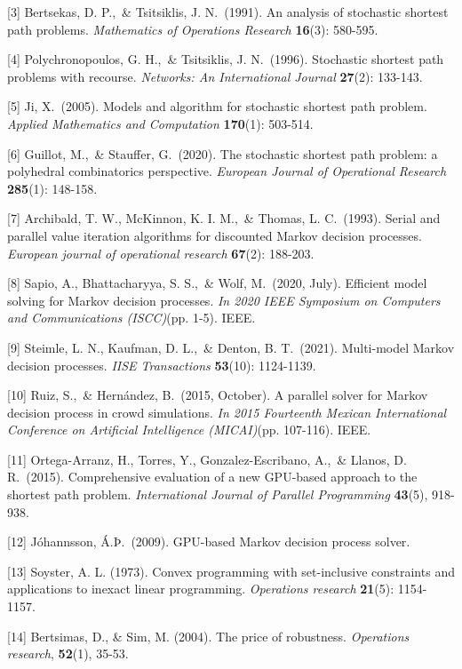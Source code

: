 \documentclass{article}
\begin{document}
[3] Bertsekas, D. P.,\ \& Tsitsiklis, J. N.\ (1991). An analysis of stochastic shortest path problems. 
  {\it Mathematics of Operations Research} {\bf 16}(3): 580-595.

[4] Polychronopoulos, G. H.,\ \& Tsitsiklis, J. N.\ (1996). Stochastic shortest path problems with 
  recourse. {\it Networks: An International Journal} {\bf 27}(2): 133-143.

[5] Ji, X.\ (2005). Models and algorithm for stochastic shortest path problem. {\it Applied Mathematics 
  and Computation} {\bf 170}(1): 503-514.

[6] Guillot, M.,\ \& Stauffer, G.\ (2020). The stochastic shortest path problem: a polyhedral combinatorics 
  perspective. {\it European Journal of Operational Research} {\bf 285}(1): 148-158.

[7] Archibald, T. W., McKinnon, K. I. M.,\ \& Thomas, L. C.\ (1993). Serial and parallel value iteration 
  algorithms for discounted Markov decision processes. {\it European journal of operational research} {\bf 67}(2): 188-203.

[8] Sapio, A., Bhattacharyya, S. S.,\ \& Wolf, M.\ (2020, July). Efficient model solving for Markov decision processes. 
  {\it In 2020 IEEE Symposium on Computers and Communications (ISCC)}(pp. 1-5). IEEE.

[9] Steimle, L. N., Kaufman, D. L.,\ \& Denton, B. T.\ (2021). Multi-model Markov decision processes. 
  {\it IISE Transactions} {\bf 53}(10): 1124-1139.

[10] Ruiz, S.,\ \& Hernández, B.\ (2015, October). A parallel solver for Markov decision process in crowd simulations. 
  {\it In 2015 Fourteenth Mexican International Conference on Artificial Intelligence (MICAI)}(pp. 107-116). IEEE.

[11] Ortega-Arranz, H., Torres, Y., Gonzalez-Escribano, A.,\ \& Llanos, D. R.\ (2015). Comprehensive evaluation of 
  a new GPU-based approach to the shortest path problem. {\it International Journal of Parallel Programming} {\bf 43}(5), 918-938.

[12] Jóhannsson, Á.Þ.\ (2009). GPU-based Markov decision process solver.

[13] Soyster, A. L. (1973). Convex programming with set-inclusive constraints and applications to inexact linear programming. 
{\it Operations research} {\bf 21}(5): 1154-1157.

[14] Bertsimas, D., & Sim, M. (2004). The price of robustness. {\it Operations research}, {\bf 52}(1), 35-53.
\end{document}

